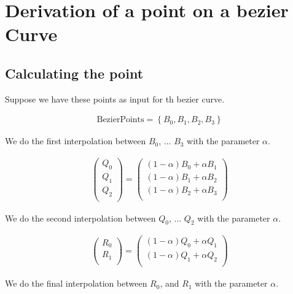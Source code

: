 \section{Derivation of a point on a bezier Curve}

\subsection{Calculating the point}
Suppose we have these points as input for th bezier curve.

\begin{align*}
    \text{BezierPoints}=\left\{B_0,B_1,B_2,B_3\right\}
\end{align*}

We do the first interpolation between $B_0$, ... $B_3$ with the parameter $\alpha$.

\begin{align*}
    \left(
    \begin{array}{c}
        Q_0 \\
        Q_1 \\
        Q_2 \\
    \end{array}
    \right)=\left(
    \begin{array}{c}
        (1-\alpha ) B_0+\alpha  B_1 \\
        (1-\alpha ) B_1+\alpha  B_2 \\
        (1-\alpha ) B_2+\alpha  B_3 \\
    \end{array}
    \right)
\end{align*}

We do the second interpolation between $Q_0$, ... $Q_2$ with the parameter $\alpha$.

\begin{align*}
    \left(
    \begin{array}{c}
        R_0 \\
        R_1 \\
    \end{array}
    \right)=\left(
    \begin{array}{c}
        (1-\alpha ) Q_0+\alpha  Q_1 \\
        (1-\alpha ) Q_1+\alpha  Q_2 \\
    \end{array}
    \right)
\end{align*}

We do the final interpolation between $R_0$, and $R_1$ with the parameter $\alpha$.

